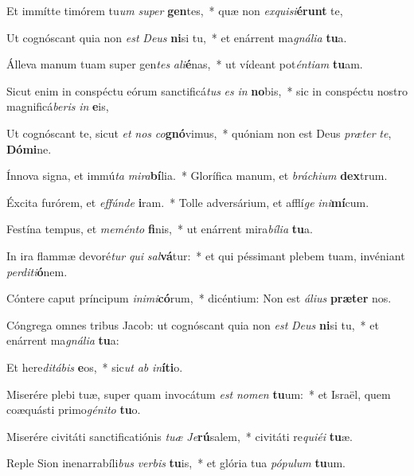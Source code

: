 \item Et immítte timórem tu\textit{um} \textit{su}\textit{per} \textbf{gen}tes,~* quæ non \textit{ex}\textit{qui}\textit{si}\textbf{é}\textbf{runt} te,
\item Ut cognóscant quia non \textit{est} \textit{De}\textit{us} \textbf{ni}si tu,~* et enárrent ma\textit{gná}\textit{li}\textit{a} \textbf{tu}a.
\item Álleva manum tuam super gen\textit{tes} \textit{a}\textit{li}\textbf{é}nas,~* ut vídeant pot\textit{én}\textit{ti}\textit{am} \textbf{tu}am.
\item Sicut enim in conspéctu eórum sanctificá\textit{tus} \textit{es} \textit{in} \textbf{no}bis,~* sic in conspéctu nostro magnificá\textit{be}\textit{ris} \textit{in} \textbf{e}is,
\item Ut cognóscant te, sicut \textit{et} \textit{nos} \textit{co}\textbf{gnó}vimus,~* quóniam non est Deus \textit{præ}\textit{ter} \textit{te}, \textbf{Dó}\textbf{mi}ne.
\item Ínnova signa, et immú\textit{ta} \textit{mi}\textit{ra}\textbf{bí}lia.~* Glorífica manum, et \textit{brá}\textit{chi}\textit{um} \textbf{dex}trum.
\item Éxcita furórem, et \textit{ef}\textit{fún}\textit{de} \textbf{i}ram.~* Tolle adversárium, et afflí\textit{ge} \textit{in}\textit{i}\textbf{mí}cum.
\item Festína tempus, et \textit{me}\textit{mén}\textit{to} \textbf{fi}nis,~* ut enárrent mira\textit{bí}\textit{li}\textit{a} \textbf{tu}a.
\item In ira flammæ devoré\textit{tur} \textit{qui} \textit{sal}\textbf{vá}tur:~* et qui péssimant plebem tuam, invéniant \textit{per}\textit{di}\textit{ti}\textbf{ó}nem.
\item Cóntere caput príncipum \textit{in}\textit{i}\textit{mi}\textbf{có}rum,~* dicéntium: Non est \textit{á}\textit{li}\textit{us} \textbf{præ}\textbf{ter} nos.
\item Cóngrega omnes tribus Jacob: ut cognóscant quia non \textit{est} \textit{De}\textit{us} \textbf{ni}si tu,~* et enárrent ma\textit{gná}\textit{li}\textit{a} \textbf{tu}a:
\item Et here\textit{di}\textit{tá}\textit{bis} \textbf{e}os,~* sic\textit{ut} \textit{ab} \textit{in}\textbf{í}\textbf{ti}o.
\item Miserére plebi tuæ, super quam invocátum \textit{est} \textit{no}\textit{men} \textbf{tu}um:~* et Israël, quem coæquásti primo\textit{gé}\textit{ni}\textit{to} \textbf{tu}o.
\item Miserére civitáti sanctificatiónis \textit{tu}\textit{æ} \textit{Je}\textbf{rú}salem,~* civitáti re\textit{qui}\textit{é}\textit{i} \textbf{tu}æ.
\item Reple Sion inenarrabíli\textit{bus} \textit{ver}\textit{bis} \textbf{tu}is,~* et glória tua \textit{pó}\textit{pu}\textit{lum} \textbf{tu}um.
